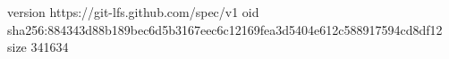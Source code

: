 version https://git-lfs.github.com/spec/v1
oid sha256:884343d88b189bec6d5b3167eec6c12169fea3d5404e612c588917594cd8df12
size 341634

